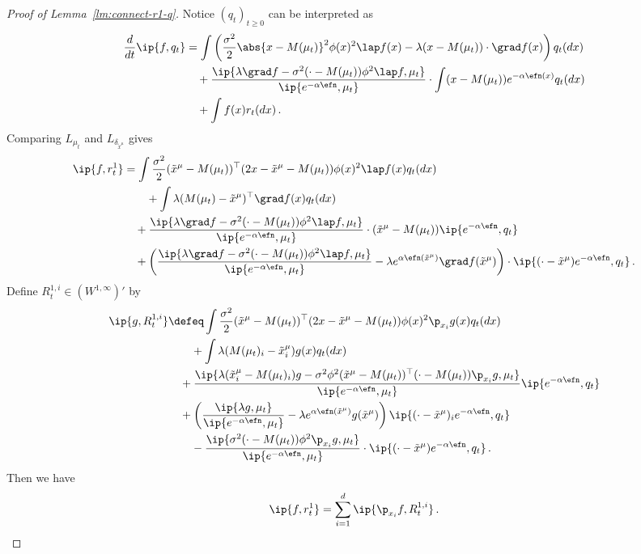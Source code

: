 \documentclass{amsart}
\begin{document}
\begin{proof}[Proof of Lemma~\ref{lm:connect-r1-q}]
	Notice $(q_t)_{t \ge 0}$ can be interpreted as 
	\begin{align*}
		\frac{d}{dt} \ip{f, q_t} & = \int \left( \frac{\sigma^2}{2} \abs{x-M(\mu_t)}^2 \phi(x)^2 \lap f(x) - \lambda (x-M(\mu_t)) \cdot \grad f(x) \right) q_t(dx) \\
		& \quad + \frac{ \ip{\lambda \grad f - \sigma^2 (\cdot - M(\mu_t)) \phi^2 \lap f, \mu_t} }{\ip{e^{-\alpha\efn}, \mu_t}} \cdot \int (x-M(\mu_t)) e^{-\alpha \efn(x)} q_t(dx) \\
		& \quad + \int f(x) r_t(dx) \,.
	\end{align*}
	Comparing $L_{\mu_t}$ and $L_{\delta_{\tilde x^\mu}}$ gives
	\begin{align*}
		\ip{f, r^1_t} & = \int \frac{\sigma^2}{2} (\tilde x^\mu - M(\mu_t))^\top (2x- \tilde x^\mu - M(\mu_t)) \phi(x)^2 \lap f(x) q_t(dx) \\
        & \qquad + \int \lambda (M(\mu_t) - \tilde x^\mu)^\top \grad f(x) q_t(dx) \\
		& \quad + \frac{ \ip{\lambda \grad f - \sigma^2 (\cdot - M(\mu_t)) \phi^2 \lap f, \mu_t} }{\ip{e^{-\alpha\efn}, \mu_t}} \cdot (\tilde x^\mu - M(\mu_t)) \ip{e^{-\alpha\efn}, q_t} \\
		& \quad + \left( \frac{ \ip{\lambda \grad f - \sigma^2 (\cdot - M(\mu_t)) \phi^2 \lap f, \mu_t} }{\ip{e^{-\alpha\efn}, \mu_t}} - \lambda e^{\alpha \efn(\tilde x^\mu)} \grad f(\tilde x^\mu) \right) \cdot \ip{(\cdot - \tilde x^\mu) e^{-\alpha\efn}, q_t} \,.
	\end{align*}
	Define $R^{1,i}_t \in (W^{1,\infty})'$ by 
	\begin{align*}
		\ip{g, R^{1,i}_t} & \defeq \int \frac{\sigma^2}{2} (\tilde x^\mu - M(\mu_t))^\top (2x- \tilde x^\mu - M(\mu_t)) \phi(x)^2 \p_{x_i} g(x) q_t(dx) \\
        & \qquad + \int \lambda (M(\mu_t)_i - \tilde x^\mu_i) g(x)  q_t(dx) \\
		& \quad + \frac{ \ip{\lambda (\tilde x^\mu_i - M(\mu_t)_i) g - \sigma^2 \phi^2 (\tilde x^\mu - M(\mu_t))^\top (\cdot - M(\mu_t)) \p_{x_i} g, \mu_t} }{\ip{e^{-\alpha\efn}, \mu_t}}  \ip{e^{-\alpha\efn}, q_t} \\
		& \quad + \left( \frac{ \ip{\lambda g, \mu_t} }{\ip{e^{-\alpha\efn}, \mu_t}} - \lambda e^{\alpha \efn(\tilde x^\mu)} g(\tilde x^\mu) \right)  \ip{(\cdot - \tilde x^\mu)_i e^{-\alpha\efn}, q_t} \\
		& \qquad - \frac{ \ip{\sigma^2 (\cdot - M(\mu_t)) \phi^2 \p_{x_i} g, \mu_t} }{\ip{e^{-\alpha\efn}, \mu_t}}  \cdot \ip{(\cdot - \tilde x^\mu) e^{-\alpha\efn}, q_t} \,.
	\end{align*}
	Then we have  
	\begin{equation*}
		\ip{f, r^1_t} = \sum_{i=1}^d \ip{\p_{x_i} f, R^{1,i}_t} \,.
	\end{equation*}


\end{proof}
\end{document}

